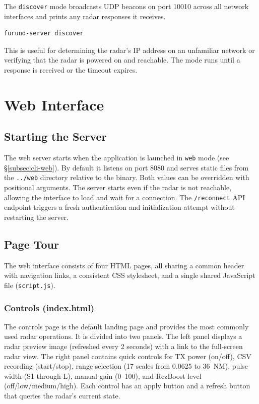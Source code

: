 \documentclass[11pt,letterpaper]{article}
\begin{document}
The \texttt{discover} mode broadcasts UDP beacons on port 10010 across all network interfaces and prints any radar responses it receives.

\begin{lstlisting}[language=bash]
furuno-server discover
\end{lstlisting}

This is useful for determining the radar's IP address on an unfamiliar network or verifying that the radar is powered on and reachable. The mode runs until a response is received or the timeout expires.


\newpage
\section{Web Interface}
\label{sec:web-interface}

\subsection{Starting the Server}
\label{subsec:starting-server}

The web server starts when the application is launched in \texttt{web} mode (see \S\ref{subsec:cli-web}). By default it listens on port 8080 and serves static files from the \texttt{../web} directory relative to the binary. Both values can be overridden with positional arguments. The server starts even if the radar is not reachable, allowing the interface to load and wait for a connection. The \texttt{/reconnect} API endpoint triggers a fresh authentication and initialization attempt without restarting the server.

\subsection{Page Tour}
\label{subsec:page-tour}

The web interface consists of four HTML pages, all sharing a common header with navigation links, a consistent CSS stylesheet, and a single shared JavaScript file (\texttt{script.js}).

\subsubsection{Controls (index.html)}
\label{subsubsec:page-controls}

The controls page is the default landing page and provides the most commonly used radar operations. It is divided into two panels. The left panel displays a radar preview image (refreshed every 2 seconds) with a link to the full-screen radar view. The right panel contains quick controls for TX power (on/off), CSV recording (start/stop), range selection (17 scales from 0.0625 to 36~NM), pulse width (S1 through L), manual gain (0--100), and RezBoost level (off/low/medium/high). Each control has an apply button and a refresh button that queries the radar's current state.
\end{document}

